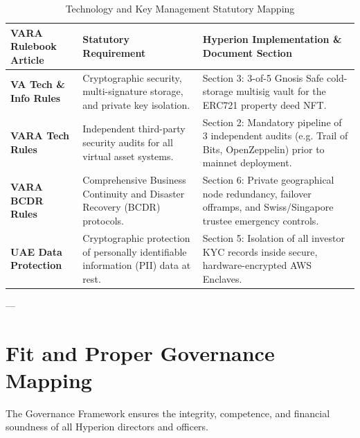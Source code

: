 \documentclass[11pt,a4paper]{article}
\begin{document}
\begin{table}[h!]
\centering
\begin{tabularx}{\textwidth}{l p{5cm} X}
\toprule
\textbf{VARA Rulebook Article} & \textbf{Statutory Requirement} & \textbf{Hyperion Implementation \& Document Section} \\
\midrule
\textbf{VA Tech \& Info Rules} & Cryptographic security, multi-signature storage, and private key isolation. & Section 3: 3-of-5 Gnosis Safe cold-storage multisig vault for the ERC721 property deed NFT. \\
\midrule
\textbf{VARA Tech Rules} & Independent third-party security audits for all virtual asset systems. & Section 2: Mandatory pipeline of 3 independent audits (e.g. Trail of Bits, OpenZeppelin) prior to mainnet deployment. \\
\midrule
\textbf{VARA BCDR Rules} & Comprehensive Business Continuity and Disaster Recovery (BCDR) protocols. & Section 6: Private geographical node redundancy, failover offramps, and Swiss/Singapore trustee emergency controls. \\
\midrule
\textbf{UAE Data Protection} & Cryptographic protection of personally identifiable information (PII) data at rest. & Section 5: Isolation of all investor KYC records inside secure, hardware-encrypted AWS Enclaves. \\
\bottomrule
\end{tabularx}
\caption{Technology and Key Management Statutory Mapping}
\end{table}

---

\section{Fit and Proper Governance Mapping}
The Governance Framework ensures the integrity, competence, and financial soundness of all Hyperion directors and officers.
\par\vspace{10pt}
\end{document}

